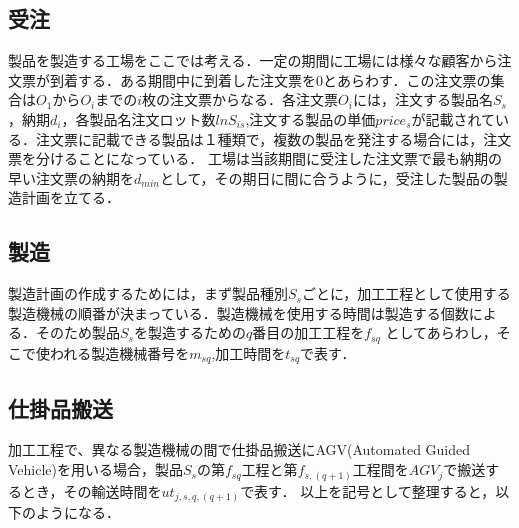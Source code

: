 \documentclass{jarticle}
\begin{document}
\subsection{受注}
製品を製造する工場をここでは考える．一定の期間に工場には様々な顧客から注文票が到着する．ある期間中に到着した注文票を$0$とあらわす．この注文票の集合は$O_1$から$O_i$までの$i$枚の注文票からなる．各注文票$O_i$には，注文する製品名$S_s$，納期$d_i$，各製品名注文ロット数$lnS_{is}$,注文する製品の単価$price_s$が記載されている．注文票に記載できる製品は１種類で，複数の製品を発注する場合には，注文票を分けることになっている．
工場は当該期間に受注した注文票で最も納期の早い注文票の納期を$d_{min}$として，その期日に間に合うように，受注した製品の製造計画を立てる．
\subsection{製造}
製造計画の作成するためには，まず製品種別$S_s$ごとに，加工工程として使用する製造機械の順番が決まっている．製造機械を使用する時間は製造する個数による．そのため製品$S_{s}$を製造するための$q$番目の加工工程を$f_{sq}$ としてあらわし，そこで使われる製造機械番号を$m_{sq}$,加工時間を$t_{sq}$で表す．

\subsection{仕掛品搬送}
加工工程で、異なる製造機械の間で仕掛品搬送にAGV(Automated Guided Vehicle)を用いる場合，製品$S_s$の第$f_{sq}$工程と第$f_{s,(q+1)}$工程間を$AGV_{j}$で搬送するとき，その輸送時間を$ut_{j,s,q,(q+1)}$で表す．
以上を記号として整理すると，以下のようになる．
\end{document}

